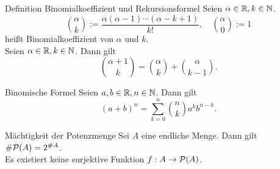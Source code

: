 \documentclass[main.tex]{subfiles}
\begin{document}
\begin{karte}{Definition Binomialkoeffizient und Rekursionsformel}
    Seien \(\alpha \in \mathbb{R}, k \in \mathbb{N} \).
    \[ \binom{\alpha}{k} := 
    \frac{ \alpha(\alpha-1)\cdots(\alpha-k+1) }{k!},
    \quad \binom{\alpha}{0} := 1 \]
    heißt Binomialkoeffizient von \(\alpha \) und \(k \). \\
    Seien \(\alpha \in \mathbb{R}, k \in \mathbb{N} \). Dann gilt
    \[ \binom{\alpha + 1}{k} = \binom{\alpha}{k} 
    + \binom{\alpha}{k-1}. \]
\end{karte}
\begin{karte}{Binomische Formel}
    Seien \(a, b \in \mathbb{R}, n \in \mathbb{N} \). Dann gilt
	\[ {(a+b)}^n = \sum_{k=0}^{n} \binom{n}{k} a^k b^{n-k}. \]
\end{karte}
\begin{karte}{Mächtigkeit der Potenzmenge}
    Sei \(A \) eine endliche Menge. Dann gilt 
    \( \# \mathcal{P}(A) = 2^{\#A} \).\\
    Es existiert keine surjektive Funktion 
    \(f : A \rightarrow \mathcal{P}(A) \).
\end{karte}
\end{document}
